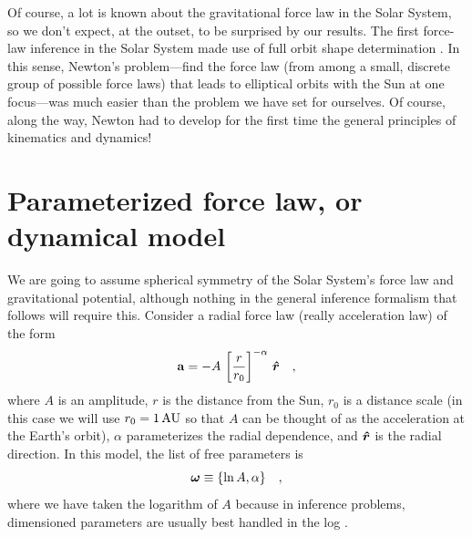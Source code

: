 Of course, a lot is known about the gravitational force law in the
Solar System, so we don't expect, at the outset, to be surprised by
our results.  The first force-law inference in the Solar System
\citep[][and also work by contemporaries, particularly Hooke, who may
  have priority]{Newton} made use of full orbit shape determination
\citep{Kepler}.  In this sense, Newton's problem---find the force law
(from among a small, discrete group of possible force laws) that leads
to elliptical orbits with the Sun at one focus---was much easier than
the problem we have set for ourselves.  Of course, along the way,
Newton had to develop for the first time the general principles of
kinematics and dynamics!

\section{Parameterized force law, or dynamical model}\label{sec:model}

We are going to assume spherical symmetry of the Solar System's force
law and gravitational potential, although nothing in the general
inference formalism that follows will require this.  Consider a radial
force law (really acceleration law) of the form
\begin{equation}
\boldsymbol{\mathbf{a}} = -A\,\left[\frac{r}{r_0}\right]^{-\alpha}\,\boldsymbol{\hat{r}} \quad,
\end{equation}
where $A$ is an amplitude, $r$ is the distance from the Sun, $r_0$ is
a distance scale (in this case we will use $r_0=1\,\mathrm{AU}$ so that $A$
can be thought of as the acceleration at the Earth's orbit), $\alpha$
parameterizes the radial dependence, and $\boldsymbol{\hat{r}}$ is the radial
direction.  In this model, the list of free parameters is
\begin{equation}
\boldsymbol{{\omega}} \equiv \{\ln A,\alpha\}\quad,
\end{equation}
where we have taken the logarithm of $A$ because in inference
problems, dimensioned parameters are usually best handled in the log
\citep{Jeffreys39a,Sivia06a}.

